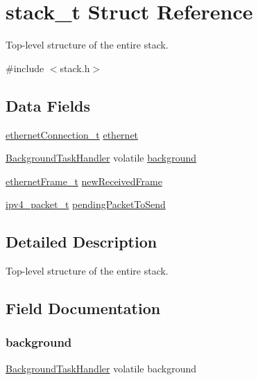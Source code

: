 \hypertarget{structstack__t}{}\section{stack\+\_\+t Struct Reference}
\label{structstack__t}


Top-\/level structure of the entire stack.  




{\ttfamily \#include $<$stack.\+h$>$}

\subsection*{Data Fields}
\begin{DoxyCompactItemize}
\item 
\mbox{\hyperlink{group__ethernet_gae7b6008a02816680c2e3a1e3d2451a60}{ethernet\+Connection\+\_\+t}} \mbox{\hyperlink{structstack__t_ad531e518750e328d180181dad48b5a47}{ethernet}}
\item 
\mbox{\hyperlink{group__background_gad47b3415c13ac85eb0e878091441c53f}{Background\+Task\+Handler}} volatile \mbox{\hyperlink{structstack__t_ad0af9bf2d27328ff7a3c7c253759ede7}{background}}
\item 
\mbox{\hyperlink{group__ethernet_ga7519a7ae14b490659069435698d28a25}{ethernet\+Frame\+\_\+t}} \mbox{\hyperlink{structstack__t_adb9d89701c6708cac78a4c6373c307e6}{new\+Received\+Frame}}
\item 
\mbox{\hyperlink{group__ipv4_ga68ea36d252d9332fd5e37d9aaedd06af}{ipv4\+\_\+packet\+\_\+t}} \mbox{\hyperlink{structstack__t_add38392b782a601d965c4f3cdca4617f}{pending\+Packet\+To\+Send}}
\end{DoxyCompactItemize}


\subsection{Detailed Description}
Top-\/level structure of the entire stack. 

\subsection{Field Documentation}
\mbox{\label{structstack__t_ad0af9bf2d27328ff7a3c7c253759ede7}} 
\subsubsection{\texorpdfstring{background}{background}}
{\footnotesize\ttfamily \mbox{\hyperlink{group__background_gad47b3415c13ac85eb0e878091441c53f}{Background\+Task\+Handler}} volatile background}

